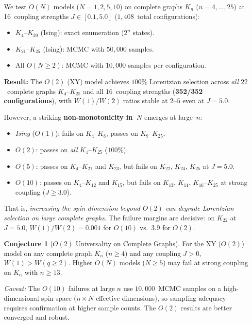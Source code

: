 \documentclass[11pt]{article}
\theoremstyle{definition}
\newtheorem{conjecture}[theorem]{Conjecture}
\theoremstyle{remark}
\begin{document}
We test $O(N)$ models ($N = 1, 2, 5, 10$) on complete graphs
$K_n$ ($n = 4, \ldots, 25$) at 16~coupling strengths $J \in [0.1, 5.0]$
($1{,}408$~total configurations):
\begin{itemize}
\item $K_4$--$K_{20}$ (Ising): exact enumeration ($2^n$ states).
\item $K_{21}$--$K_{25}$ (Ising): MCMC with $50{,}000$ samples.
\item All $O(N \geq 2)$: MCMC with $10{,}000$ samples per configuration.
\end{itemize}

\noindent\textbf{Result:} The $O(2)$ (XY) model achieves $100\%$ Lorentzian
selection across \emph{all} $22$~complete graphs $K_4$--$K_{25}$ and all
$16$~coupling strengths (\textbf{352/352 configurations}), with $W(1)/W(2)$
ratios stable at $2$--$5$ even at $J = 5.0$.

However, a striking \textbf{non-monotonicity in~$N$} emerges at large~$n$:
\begin{itemize}
\item \emph{Ising} ($O(1)$): fails on $K_4$--$K_8$, passes on $K_9$--$K_{25}$.
\item \emph{$O(2)$}: passes on \emph{all} $K_4$--$K_{25}$ ($100\%$).
\item \emph{$O(5)$}: passes on $K_4$--$K_{21}$ and $K_{23}$, but fails on
  $K_{22}$, $K_{24}$, $K_{25}$ at $J = 5.0$.
\item \emph{$O(10)$}: passes on $K_4$--$K_{12}$ and $K_{15}$, but fails on
  $K_{13}$, $K_{14}$, $K_{16}$--$K_{25}$ at strong coupling ($J \geq 3.0$).
\end{itemize}
That is, \emph{increasing the spin dimension beyond $O(2)$ can degrade
Lorentzian selection on large complete graphs}.
The failure margins are decisive: on $K_{22}$ at $J = 5.0$,
$W(1)/W(2) = 0.001$ for $O(10)$ vs.\ $3.9$ for $O(2)$.

\begin{conjecture}[$O(2)$ Universality on Complete Graphs]
\label{conj:continuous-kn}
For the XY ($O(2)$) model on any complete graph $K_n$ ($n \geq 4$) and
any coupling $J > 0$, $W(1) > W(q \geq 2)$.  Higher $O(N)$ models
($N \geq 5$) may fail at strong coupling on $K_n$ with $n \geq 13$.
\end{conjecture}

\noindent\emph{Caveat:} The $O(10)$ failures at large $n$ use $10{,}000$~MCMC
samples on a high-dimensional spin space ($n \times N$ effective dimensions),
so sampling adequacy requires confirmation at higher sample counts.  The
$O(2)$ results are better converged and robust.
\end{document}
